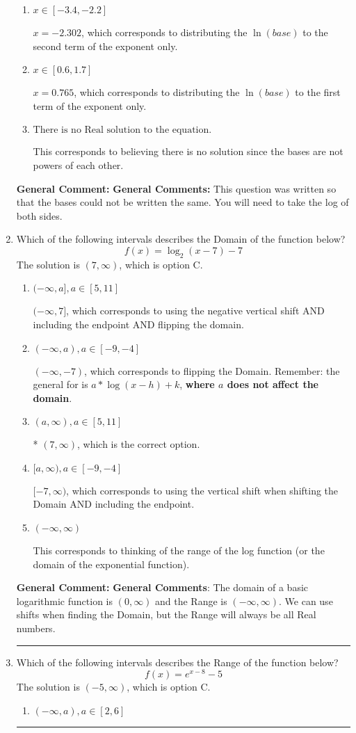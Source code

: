 \documentclass{extbook}[14pt]
\newcommand{\litem}[1]{\item #1

\rule{\textwidth}{0.4pt}}
\begin{document}
\begin{enumerate}
{\begin{enumerate}[label=\Alph*.]
$x = -0.500$, which corresponds to solving the numerators as equal while ignoring the bases are different.
\item \( x \in [-3.4, -2.2] \)

$x = -2.302$, which corresponds to distributing the $\ln(base)$ to the second term of the exponent only.
\item \( x \in [0.6, 1.7] \)

$x = 0.765$, which corresponds to distributing the $\ln(base)$ to the first term of the exponent only.
\item \( \text{There is no Real solution to the equation.} \)

This corresponds to believing there is no solution since the bases are not powers of each other.
\end{enumerate}

\textbf{General Comment:} \textbf{General Comments:} This question was written so that the bases could not be written the same. You will need to take the log of both sides.
}
\litem{
Which of the following intervals describes the Domain of the function below?
\[ f(x) = \log_2{(x-7)}-7 \]The solution is \( (7, \infty) \), which is option C.\begin{enumerate}[label=\Alph*.]
\item \( (-\infty, a], a \in [5, 11] \)

$(-\infty, 7]$, which corresponds to using the negative vertical shift AND including the endpoint AND flipping the domain.
\item \( (-\infty, a), a \in [-9, -4] \)

$(-\infty, -7)$, which corresponds to flipping the Domain. Remember: the general for is $a*\log(x-h)+k$, \textbf{where $a$ does not affect the domain}.
\item \( (a, \infty), a \in [5, 11] \)

* $(7, \infty)$, which is the correct option.
\item \( [a, \infty), a \in [-9, -4] \)

$[-7, \infty)$, which corresponds to using the vertical shift when shifting the Domain AND including the endpoint.
\item \( (-\infty, \infty) \)

This corresponds to thinking of the range of the log function (or the domain of the exponential function).
\end{enumerate}

\textbf{General Comment:} \textbf{General Comments}: The domain of a basic logarithmic function is $(0, \infty)$ and the Range is $(-\infty, \infty)$. We can use shifts when finding the Domain, but the Range will always be all Real numbers.
}
\litem{
Which of the following intervals describes the Range of the function below?
\[ f(x) = e^{x-8}-5 \]The solution is \( (-5, \infty) \), which is option C.\begin{enumerate}[label=\Alph*.]
\item \( (-\infty, a), a \in [2, 6] \)


\end{enumerate}}
\end{enumerate}
\end{document}
